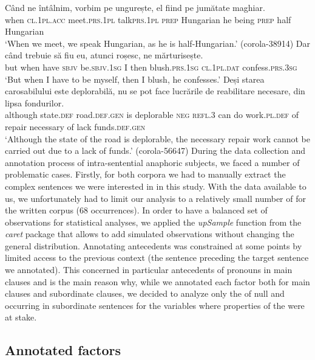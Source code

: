\documentclass[output=paper,colorlinks,citecolor=brown]{langscibook}
\begin{document}
\ea
\ea \label{gerund:Istrate}  
\gll Când	ne	întâlnim,	vorbim	pe	ungurește,	el	fiind	pe jumătate	maghiar. \\
when \textsc{cl.1pl}.\textsc{acc}
meet.\textsc{prs.1pl} talk\textsc{prs.1pl} \textsc{prep} Hungarian he being \textsc{prep} half Hungarian \\
\glt `When we meet, we speak Hungarian, as he is half-Hungarian.' (corola-38914)      
\ex 
\gll Dar	când	trebuie	să fiu	eu,		atunci	roșesc,	ne	mărturisește.\\
but when have \textsc{sbjv} be.\textsc{sbjv.1sg} I then  blush\textsc{.prs.1sg} \textsc{cl.1pl.dat}
confess.\textsc{prs.3sg}  \\
\glt `But when I have to be myself, then I blush, he confesses.'  
\label{disc_pers:Istrate} 
\ex 
\gll Deși		starea		carosabilului	este	deplorabilă,	nu	se	pot	face lucrările de reabilitare	 necesare,		din lipsa fondurilor. \\
although state\textsc{.def} road.\textsc{def.gen} is deplorable \textsc{neg} \textsc{refl.3} can do work.\textsc{pl.def} of repair necessary of lack funds.\textsc{def.gen}  \\
\label{impers:Istrate} 
\glt `Although the state of the road is deplorable, the necessary repair work cannot be carried out due to a lack of funds.' (corola-56647)
\z
\z
During the data collection and annotation process of intra-sentential anaphoric subjects, we faced a number of problematic cases. Firstly, for both corpora we had to manually extract the complex sentences we were interested in in this study. With the data available to us, we unfortunately had to limit our analysis to a relatively small number of  for the written corpus (68 occurrences). In order to have a balanced set of observations for statistical analyses, we applied the \textit{upSample} function from the \textit{caret} package \citep{Kuhn2008} that allows to add simulated observations without changing the general distribution.
Annotating antecedents was constrained at some points by limited access to the previous context (the sentence preceding the target sentence we annotated). This concerned in particular antecedents of pronouns in main clauses and is the main reason why, while we annotated each factor both for main clauses and subordinate clauses, we decided to analyze only the  of null and  occurring in subordinate sentences for the variables where properties of the  were at stake.

\subsection{Annotated factors}
\end{document}
